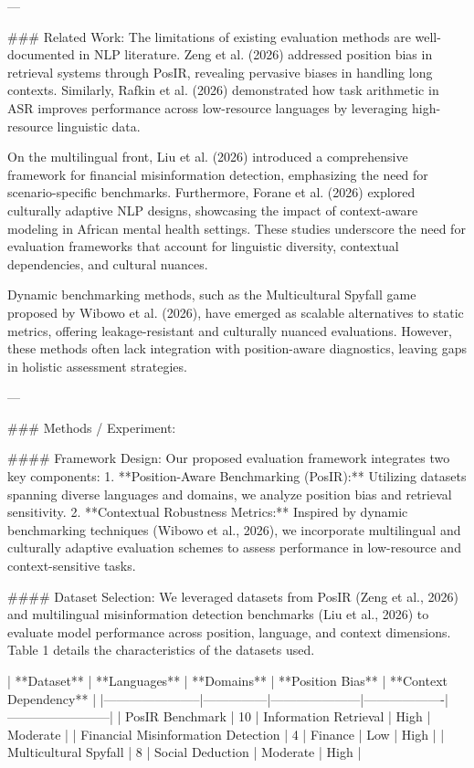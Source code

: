 ---

### Related Work:  
The limitations of existing evaluation methods are well-documented in NLP literature. Zeng et al. (2026) addressed position bias in retrieval systems through PosIR, revealing pervasive biases in handling long contexts. Similarly, Rafkin et al. (2026) demonstrated how task arithmetic in ASR improves performance across low-resource languages by leveraging high-resource linguistic data.

On the multilingual front, Liu et al. (2026) introduced a comprehensive framework for financial misinformation detection, emphasizing the need for scenario-specific benchmarks. Furthermore, Forane et al. (2026) explored culturally adaptive NLP designs, showcasing the impact of context-aware modeling in African mental health settings. These studies underscore the need for evaluation frameworks that account for linguistic diversity, contextual dependencies, and cultural nuances.

Dynamic benchmarking methods, such as the Multicultural Spyfall game proposed by Wibowo et al. (2026), have emerged as scalable alternatives to static metrics, offering leakage-resistant and culturally nuanced evaluations. However, these methods often lack integration with position-aware diagnostics, leaving gaps in holistic assessment strategies.

---

### Methods / Experiment:  

#### Framework Design:  
Our proposed evaluation framework integrates two key components:  
1. **Position-Aware Benchmarking (PosIR):** Utilizing datasets spanning diverse languages and domains, we analyze position bias and retrieval sensitivity.  
2. **Contextual Robustness Metrics:** Inspired by dynamic benchmarking techniques (Wibowo et al., 2026), we incorporate multilingual and culturally adaptive evaluation schemes to assess performance in low-resource and context-sensitive tasks.

#### Dataset Selection:  
We leveraged datasets from PosIR (Zeng et al., 2026) and multilingual misinformation detection benchmarks (Liu et al., 2026) to evaluate model performance across position, language, and context dimensions. Table 1 details the characteristics of the datasets used.

| **Dataset**           | **Languages** | **Domains**         | **Position Bias** | **Context Dependency** |
|-----------------------|---------------|---------------------|-------------------|------------------------|
| PosIR Benchmark       | 10            | Information Retrieval | High              | Moderate              |
| Financial Misinformation Detection | 4            | Finance             | Low               | High                  |
| Multicultural Spyfall | 8            | Social Deduction    | Moderate          | High                  |

